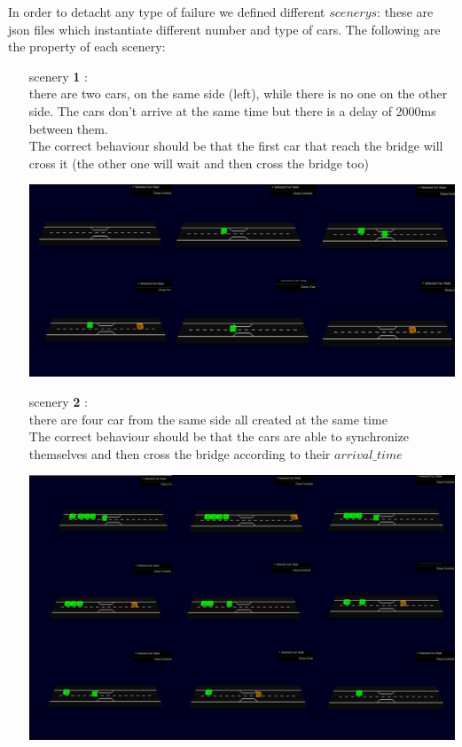 In order to detacht any type of failure we defined different $scenerys$: these are json files which instantiate
different number and type of cars. The following are the property of each scenery:
\begin{itemize}
    \item[scenery \textbf{1}]: \\ there are two cars, on the same side (left), while there is no one on the other 
    side. The cars don't arrive at the same time but there is a delay of 2000ms between them. \\
    The correct behaviour should be that the first car that reach the bridge will cross it (the other 
    one will wait and then cross the bridge too) \\
    \begin{center}
        \includegraphics[scale=0.3, width=\linewidth]{assets/sc1.jpg}
    \end{center}
    \item[scenery \textbf{2}]: \\ there are four car from the same side all created at the same time \\The correct behaviour should be that 
    the cars are able to synchronize themselves and then cross the bridge according to their $arrival\_time$
    \\
    \begin{center}
        \includegraphics[scale=0.3, width=\linewidth]{assets/sc2.jpg}

\end{center}
\end{itemize}
